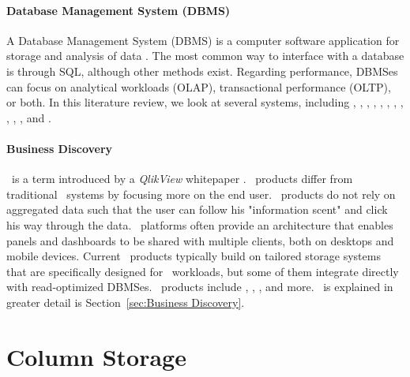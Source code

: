 \paragraph{Database Management System (DBMS)}
\label{par:Database Management System (DBMS)}
A Database Management System (DBMS) is a computer software application for storage and analysis of data \cite{Wikipedia_contributors2015-pb}. The most common way to interface with a database is through SQL, although other methods exist. Regarding performance, DBMSes can focus on analytical workloads (OLAP), transactional performance (OLTP), or both. In this literature review, we look at several systems, including \oracle, \ibm, \saph, \sapnw, \mssql, \cstore, \vertica, \blink, \exasol, \oracle, \hyper, and \hyrise. 

\paragraph{Business Discovery}
\label{par:Business Discovery}
\bd~is a term introduced by a \textit{QlikView} whitepaper \cite{Qlik2014-vd}. \bd~products differ from traditional \bi~systems by focusing more on the end user. \bd~products do not rely on aggregated data such that the user can follow his "information scent" and click his way through the data. \bd~platforms often provide an architecture that enables panels and dashboards to be shared with multiple clients, both on desktops and mobile devices. Current \bd~products typically build on tailored storage systems that are specifically designed for \bd~workloads, but some of them integrate directly with read-optimized DBMSes. \bd~products include \tableau, \qlikview, \powerpivot, and more. \bd~is explained in greater detail is Section~\ref{sec:Business Discovery}. 


\section{Column Storage}
\label{sec:Column Storage}

